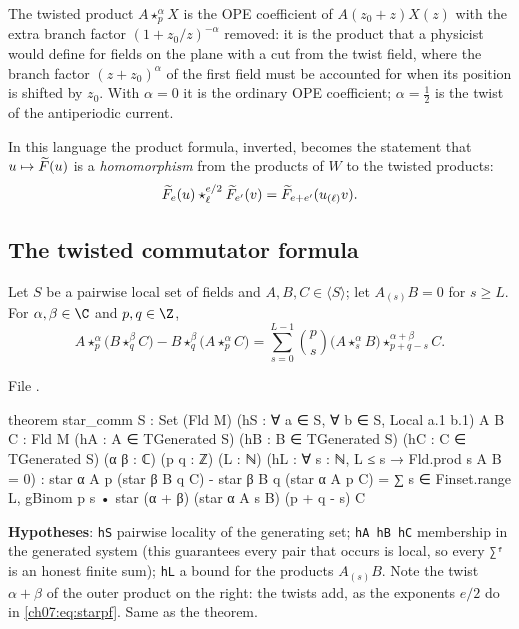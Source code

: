 \begin{physics}
The twisted product $A\star^\alpha_pX$ is the OPE coefficient of $A(z_0+z)X(z)$ with the extra branch factor $(1+z_0/z)^{-\alpha}$ removed: it is the product that a physicist would define for fields on the plane with a cut from the twist field, where the branch factor $(z+z_0)^{\alpha}$ of the first field must be accounted for when its position is shifted by $z_0$. With $\alpha=0$ it is the ordinary OPE coefficient; $\alpha=\tfrac12$ is the twist of the antiperiodic current.
\end{physics}

In this language the product formula, inverted, becomes the statement that $u\mapsto
\widetilde{F}(u)$ is a \emph{homomorphism} from the products of $W$ to the twisted products:
\begin{equation}\label{ch07:eq:starpf}
  \widetilde{F}_e(u)\star^{e/2}_{\ell}\widetilde{F}_{e'}(v) = \widetilde{F}_{e+e'}(u_{(\ell)}v).
\end{equation}

\subsection{The twisted commutator formula}

\begin{theorem}\label{ch07:thm:starcomm}
Let $S$ be a pairwise local set of fields and $A,B,C\in\langle S\rangle$; let $A_{(s)}B = 0$ for
$s\ge L$. For $\alpha,\beta\in\C$ and $p,q\in\Z$,
\begin{equation*}
  A\star^\alpha_p\bigl(B\star^\beta_qC\bigr) - B\star^\beta_q\bigl(A\star^\alpha_pC\bigr)
  = \sum_{s=0}^{L-1}\binom ps\bigl(A\star^\alpha_sB\bigr)\star^{\alpha+\beta}_{p+q-s}C .
\end{equation*}
\end{theorem}

\noindent File .
\begin{leancode}
theorem star_comm {S : Set (Fld M)} (hS : ∀ a ∈ S, ∀ b ∈ S, Local a.1 b.1) {A B C : Fld M}
    (hA : A ∈ TGenerated S) (hB : B ∈ TGenerated S) (hC : C ∈ TGenerated S) (α β : ℂ)
    (p q : ℤ) (L : ℕ) (hL : ∀ s : ℕ, L ≤ s → Fld.prod s A B = 0) :
    star α A p (star β B q C) - star β B q (star α A p C)
      = ∑ s ∈ Finset.range L, gBinom p s • star (α + β) (star α A s B) (p + q - s) C
\end{leancode}

\begin{dictionary}
\textbf{Hypotheses}: \verb|hS| pairwise locality of the generating set; \verb|hA hB hC|
membership in the generated system (this guarantees every pair that occurs is local, so every
\verb|∑ᶠ| is an honest finite sum); \verb|hL| a bound for the products $A_{(s)}B$. Note the
twist $\alpha+\beta$ of the outer product on the right: the twists add, as the exponents
$e/2$ do in \eqref{ch07:eq:starpf}. Same as the theorem.
\end{dictionary}

